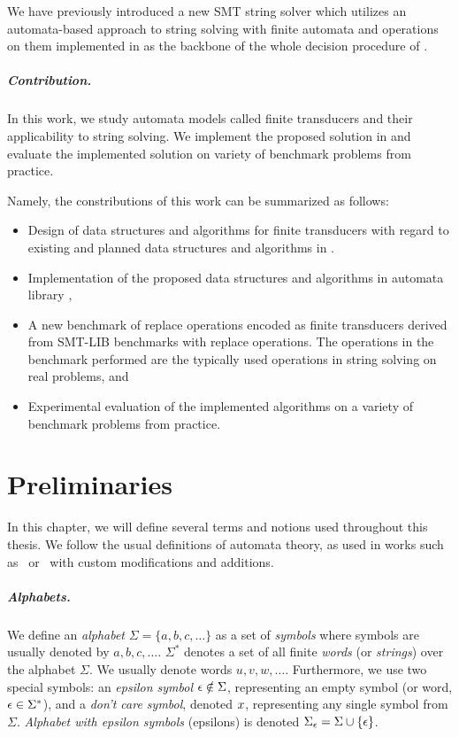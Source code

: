 We have previously introduced a new SMT string solver \noodler which utilizes an automata-based approach to string solving with finite automata and operations on them implemented in \mata as the backbone of the whole decision procedure of \noodler.

\paragraph{Contribution.}
In this work, we study automata models called finite transducers and their applicability to string solving. We implement the proposed solution in \mata and evaluate the implemented solution on variety of benchmark problems from practice.

Namely, the constributions of this work can be summarized as follows:
\begin{itemize}
  \item Design of data structures and algorithms for finite transducers with regard to existing and planned data structures and algorithms in \mata.
  \item Implementation of the proposed data structures and algorithms in automata library \mata,
  \item A new benchmark of replace operations encoded as finite transducers derived from SMT-LIB benchmarks with replace operations. The operations in the benchmark performed are the typically used operations in string solving on real problems, and
  \item Experimental evaluation of the implemented algorithms on a variety of benchmark problems from practice.
\end{itemize}

\chapter{Preliminaries}
In this chapter, we will define several terms and notions used throughout this thesis.
We follow the usual definitions of automata theory, as used in works such as~\cite{Esparza} or~\cite{Sipser} with custom modifications and additions.

\paragraph{Alphabets.}
We define an \emph{alphabet} $\Sigma = \{ a, b, c, \ldots \}$ as a set of \emph{symbols} where
symbols are usually denoted by $a, b, c, \ldots$.
$\Sigma^*$ denotes a set of all finite \emph{words} (or \emph{strings}) over the alphabet $\Sigma$.
We usually denote words $u, v, w, \ldots$.
Furthermore, we use two special symbols: an \emph{epsilon symbol} $\epsilon \notin \Sigma$, representing an empty symbol (or word, $\epsilon \in \Sigma^*$), and a \emph{don't care symbol}, denoted $x$, representing any single symbol from $\Sigma$.
\emph{Alphabet with epsilon symbols} (epsilons) is denoted $\Sigma_\epsilon = \Sigma \cup \{ \epsilon \}$.

